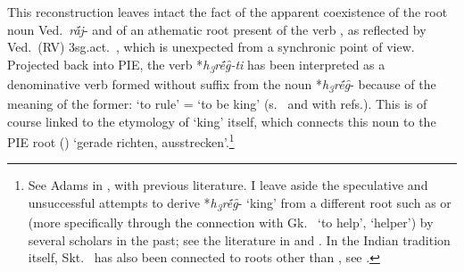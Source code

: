 \documentclass[output=paper,colorlinks,citecolor=brown]{langscibook}
\begin{document}
This reconstruction leaves intact the fact of the apparent coexistence of the root noun Ved.\  \textit{rā́j}-  and of an athematic root present of the verb , as reflected by Ved.\  (RV) 3sg.act.\ , which is unexpected from a synchronic point of view. Projected back into PIE, the verb *\textit{h\textsubscript{3}rḗg̑-ti}  has been interpreted as a denominative verb formed without suffix from the noun *\textit{h\textsubscript{3}rḗg̑}- because of the meaning of the former: ‘to rule’ = ‘to be king’ (s.\  and  with refs.). This is of course linked to the etymology of ‘king’ itself, which connects this noun to the PIE root  () ‘gerade richten, ausstrecken’.\footnote{See Adams in \citealt[329--331]{MalloryAdams}, with previous literature. I leave aside the speculative and unsuccessful attempts to derive *\textit{h\textsubscript{3}rḗg̑}- ‘king’ from a different root such as  or  (more specifically  through the connection with Gk.\   ‘to help’,  ‘helper’) by several scholars in the past; see the literature in  and . In the Indian tradition itself, Skt.\   has also been connected to roots other than , see \citealt{Hara1969}.} 
\end{document}
